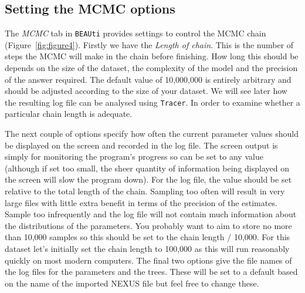 \documentclass[cup7b, english]{cupbook}
\begin{document}
\subsection{Setting the MCMC options}
\label{MCMC_options}

The {\it MCMC} tab in \texttt{BEAUti} provides settings to control the MCMC chain (Figure~\ref{fig:figure4}). Firstly we have the
{\it Length of chain}. This is the number of steps the MCMC will make in the chain before
finishing. How long this should be depends on the size of the dataset, the complexity of the
model and the precision of the answer required. The default value of 10,000,000 is entirely
arbitrary and should be adjusted according to the size of your dataset. We will see later how
the resulting log file can be analysed using \texttt{Tracer}. In order to examine whether a particular 
chain length is adequate.

The next couple of options specify how often the current parameter values should be displayed
on the screen and recorded in the log file. The screen output is simply for monitoring the
program's progress so can be set to any value (although if set too small, the sheer quantity
of information being displayed on the screen will slow the program down). For the log
file, the value should be set relative to the total length of the chain. Sampling too often
will result in very large files with little extra benefit in terms of the precision of the
estimates. Sample too infrequently and the log file will not contain much information about
the distributions of the parameters. You probably want to aim to store no more than 10,000
samples so this should be set to the chain length / 10,000. For this dataset let's initially
set the chain length to 100,000 as this will run reasonably quickly on most modern
computers. The final two options give the file names of the log files for the parameters and the trees.
These will be set to a default based on the name of the imported NEXUS file but feel free
to change these.
\end{document}
